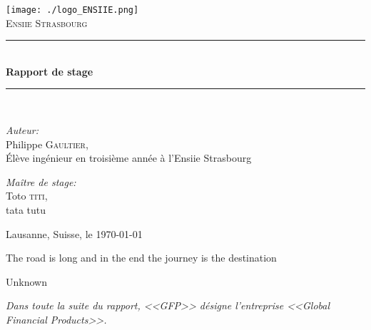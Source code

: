 \documentclass[a4paper,french,12pt]{article}
\newcommand{\HRule}{\rule{\linewidth}{0.5mm}}
\begin{document}
\begin{titlepage}
\begin{center}

\texttt{[image: ./logo\_ENSIIE.png]}~\\[1cm]
\textsc{\huge Ensiie Strasbourg}\\[1.5cm]

\HRule \\[0.4cm]
{
	\huge \bfseries Rapport de stage
\\[0.4cm] }
\HRule \\[1.5cm]

\begin{minipage}{0.4\textwidth}
\begin{flushleft} \huge
\emph{Auteur:}\\
Philippe \textsc{Gaultier},\\[0.5cm]
\Large \'Elève ingénieur en troisième année à l'Ensiie Strasbourg
\end{flushleft}
\end{minipage}
\begin{minipage}{0.4\textwidth}
\begin{flushright} \huge
\emph{Maître de stage:} \\
Toto \textsc{titi},\\[0.5cm]
\Large tata tutu
\end{flushright}
\end{minipage}

\vfill

{\large Lausanne, Suisse, le \today}



\end{center}
\end{titlepage}

\newpage
{
  \centering
  {
    \vspace{3cm}

    \vspace{3cm}
    \epigraph{The road is long and in the end the journey is the destination}{Unknown}
  }
}
\newpage
\textit{\normalsize Dans toute la suite du rapport, <<GFP>> désigne l'entreprise <<Global Financial Products>>.}
\setlength{\columnseprule}{0.5pt}

\tableofcontents
\listoffigures
\end{document}
